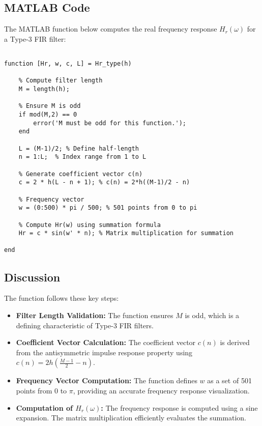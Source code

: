 \documentclass[a4paper,12pt]{article}
\begin{document}
\subsection{MATLAB Code}

The MATLAB function below computes the real frequency response \( H_r(\omega) \) for a Type-3 FIR filter:

\begin{verbatim}
    
function [Hr, w, c, L] = Hr_type(h)

    % Compute filter length
    M = length(h);
    
    % Ensure M is odd
    if mod(M,2) == 0
        error('M must be odd for this function.');
    end
    
    L = (M-1)/2; % Define half-length
    n = 1:L;  % Index range from 1 to L

    % Generate coefficient vector c(n)
    c = 2 * h(L - n + 1); % c(n) = 2*h((M-1)/2 - n)

    % Frequency vector
    w = (0:500) * pi / 500; % 501 points from 0 to pi

    % Compute Hr(w) using summation formula
    Hr = c * sin(w' * n); % Matrix multiplication for summation

end
\end{verbatim}

\subsection{Discussion}

The function follows these key steps:

\begin{itemize}
    \item \textbf{Filter Length Validation:} The function ensures \( M \) is odd, which is a defining characteristic of Type-3 FIR filters.
    
    \item \textbf{Coefficient Vector Calculation:} The coefficient vector \( c(n) \) is derived from the antisymmetric impulse response property using \( c(n) = 2h\left(\frac{M-1}{2} - n\right) \).
    
    \item \textbf{Frequency Vector Computation:} The function defines \( w \) as a set of 501 points from \( 0 \) to \( \pi \), providing an accurate frequency response visualization.
    
    \item \textbf{Computation of \( H_r(\omega) \):} The frequency response is computed using a sine expansion. The matrix multiplication efficiently evaluates the summation.

\end{itemize}
\end{document}

